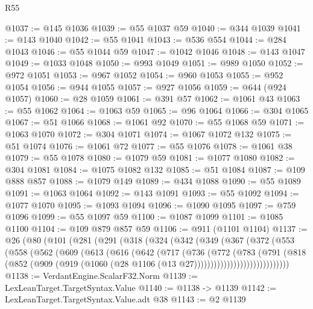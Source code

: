 \begin{lexlean}{R55}
\begin{coremodule}
@1037 := @145 @1036
@1039 := @55 @1037 @59
@1040 := @344 @1039
@1041 := @143 @1040
@1042 := @55 @1041
@1043 := @536 @554
@1044 := @284 @1043
@1046 := @55 @1044 @59
@1047 := @1042 @1046
@1048 := @143 @1047
@1049 := @1033 @1048
@1050 := @993 @1049
@1051 := @989 @1050
@1052 := @972 @1051
@1053 := @967 @1052
@1054 := @960 @1053
@1055 := @952 @1054
@1056 := @944 @1055
@1057 := @927 @1056
@1059 := @644 (@924 @1057)
@1060 := @28 @1059
@1061 := @391 @57
@1062 := @1061 @43
@1063 := @55 @1062
@1064 := @1063 @59
@1065 := @96 @1064
@1066 := @304 @1065
@1067 := @51 @1066
@1068 := @1061 @92
@1070 := @55 @1068 @59
@1071 := @1063 @1070
@1072 := @304 @1071
@1074 := @1067 @1072 @132
@1075 := @51 @1074
@1076 := @1061 @72
@1077 := @55 @1076
@1078 := @1061 @38
@1079 := @55 @1078
@1080 := @1079 @59
@1081 := @1077 @1080
@1082 := @304 @1081
@1084 := @1075 @1082 @132
@1085 := @51 @1084
@1087 := @109 @888 @857
@1088 := @1079 @149
@1089 := @434 @1088
@1090 := @55 @1089
@1091 := @1063 @1064
@1092 := @143 @1091
@1093 := @55 @1092
@1094 := @1077 @1070
@1095 := @1093 @1094
@1096 := @1090 @1095
@1097 := @759 @1096
@1099 := @55 @1097 @59
@1100 := @1087 @1099
@1101 := @1085 @1100
@1104 := @109 @879 @857 @59
@1106 := @911 (@1101 @1104)
@1137 := @26
    (@80
      (@101
        (@281
          (@291
            (@318
              (@324
                (@342
                  (@349
                    (@367
                      (@372
                        (@553
                          (@558
                            (@562
                              (@609
                                (@613
                                  (@616
                                    (@642
                                      (@717
                                        (@736
                                          (@772
                                            (@783
                                              (@791
                                                (@818
                                                  (@852
                                                    (@909
                                                      (@919
                                                        (@1060
                                                          (@28
                                                            @1106
                                                            (@13 @27)))))))))))))))))))))))))))))
@1138 := VerdantEngine.ScalarF32.Norm
@1139 := LexLeanTarget.TargetSyntax.Value
@1140 := @1138 -> @1139
@1142 := LexLeanTarget.TargetSyntax.Value.adt @38
@1143 := @2 @1139

\end{coremodule}
\end{lexlean}
